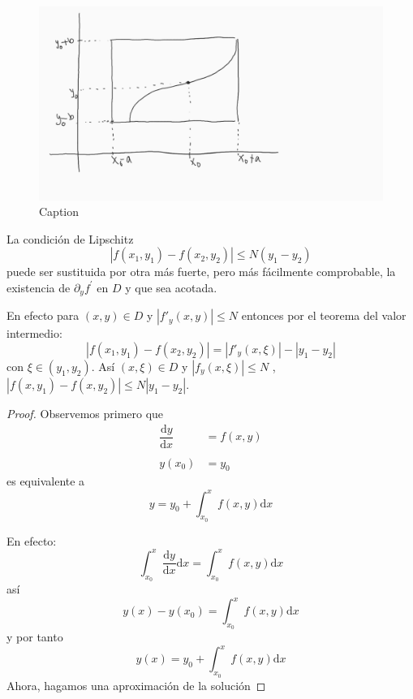 \begin{figure}[H]
    \centering
    \includegraphics[scale=0.25]{graficas1.png}
    \caption{Caption}
    \label{fig:my_label}
\end{figure}


La condición de Lipschitz 
$$
|f(x_1,y_1)-f(x_2,y_2)|\leq N(y_1-y_2)
$$
puede ser sustituida por otra más fuerte, pero más fácilmente comprobable, la existencia de $\partial_{y} f^{'}$ en $D$ y que sea acotada.

En efecto para $(x,y)\in D$ y $|f'_y(x,y)|\leq N$ entonces por el teorema del valor intermedio:
$$
|f(x_1,y_1)-f(x_2,y_2)|=|f'_y(x,\xi)|-|y_1-y_2| 
$$
con $\xi\in (y_1,y_2)$. Así $(x,\xi)\in D$ y $|f_y(x,\xi)|\leq N$ , $|f(x,y_1)-f(x,y_2)|\leq N|y_1-y_2|$.

\begin{proof}
Observemos primero que 
$$
\left.\begin{array}{cc}
    \dfrac{\mathrm{d}y}{\mathrm{d}x}&=f(x,y)  \\
    &\\
    y(x_0) &=y_0 
\end{array}\right.
$$
es equivalente a
$$
y=y_0+\int_{x_0}^xf(x,y)\mathrm{d}x
$$

En efecto:
$$
\int_{x_0}^x\frac{\mathrm{d}y}{\mathrm{d}x}\mathrm{d}x=\int_{x_0}^xf(x,y)\mathrm{d}x
$$
así
$$
y(x)-y(x_0)=\int_{x_0}^xf(x,y)\mathrm{d}x
$$
y por tanto
$$
y(x)=y_0+\int_{x_0}^xf(x,y)\mathrm{d}x
$$
Ahora, hagamos una aproximación de  la solución 
\end{proof}
